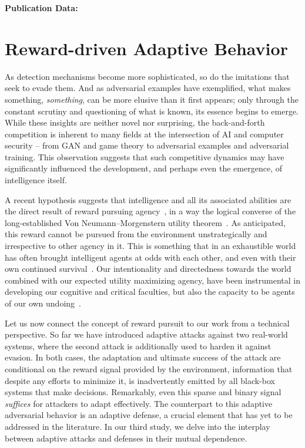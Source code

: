 \textbf{Publication Data:} 

\section{Reward-driven Adaptive Behavior}

As detection mechanisms become more sophisticated, so do the imitations that seek to evade them.
And as adversarial examples have exemplified, what makes something, \textit{something}, can be more elusive than it first appears; only through the constant scrutiny and questioning of what is known, its essence begins to emerge.
While these insights are neither novel nor surprising, the back-and-forth competition is inherent to many fields at the intersection of \gls{AI} and computer security -- from \gls{GAN} and game theory to adversarial examples and adversarial training.
This observation suggests that such competitive dynamics may have significantly influenced the development, and perhaps even the emergence, of intelligence itself.

A recent hypothesis suggests that intelligence and all its associated abilities are the direct result of reward pursuing agency~\cite{silver2021reward}, in a way the logical converse of the long-established Von Neumann–Morgenstern utility theorem~\cite{von1947theory}.
As anticipated, this reward cannot be pursued from the environment unstrategically and irrespective to other agency in it.
This is something that in an exhaustible world has often brought intelligent agents at odds with each other, and even with their own continued survival~\cite{tohme2019superrational}.
Our intentionality and directedness towards the world combined with our expected utility maximizing agency, have been instrumental in developing our cognitive and critical faculties, but also the capacity to be agents of our own undoing~\cite{rlblogpost, skalse2022defining}.

Let us now connect the concept of reward pursuit to our work from a technical perspective.
So far we have introduced adaptive attacks against two real-world systems, where the second attack is additionally used to harden it against evasion.
In both cases, the adaptation and ultimate success of the attack are conditional on the reward signal provided by the environment, information that despite any efforts to minimize it, is inadvertently emitted by all black-box systems that make decisions.
Remarkably, even this sparse and binary signal \textit{suffices} for attackers to adapt effectively.
The counterpart to this adaptive adversarial behavior is an adaptive defense, a crucial element that has yet to be addressed in the literature.
In our third study, we delve into the interplay between adaptive attacks and defenses in their mutual dependence.

